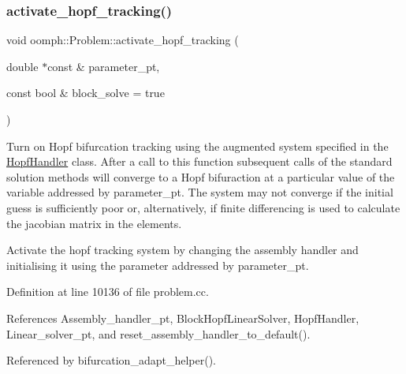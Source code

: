 \subsubsection{\texorpdfstring{activate\+\_\+hopf\+\_\+tracking()}{activate\_hopf\_tracking()}\hspace{0.1cm}{\footnotesize\ttfamily [1/2]}}
{\footnotesize\ttfamily void oomph\+::\+Problem\+::activate\+\_\+hopf\+\_\+tracking (\begin{DoxyParamCaption}\item[{double $\ast$const \&}]{parameter\+\_\+pt,  }\item[{const bool \&}]{block\+\_\+solve = {\ttfamily true} }\end{DoxyParamCaption})}



Turn on Hopf bifurcation tracking using the augmented system specified in the \hyperlink{classoomph_1_1HopfHandler}{Hopf\+Handler} class. After a call to this function subsequent calls of the standard solution methods will converge to a Hopf bifuraction at a particular value of the variable addressed by parameter\+\_\+pt. The system may not converge if the initial guess is sufficiently poor or, alternatively, if finite differencing is used to calculate the jacobian matrix in the elements. 

Activate the hopf tracking system by changing the assembly handler and initialising it using the parameter addressed by parameter\+\_\+pt. 

Definition at line 10136 of file problem.\+cc.



References Assembly\+\_\+handler\+\_\+pt, Block\+Hopf\+Linear\+Solver, Hopf\+Handler, Linear\+\_\+solver\+\_\+pt, and reset\+\_\+assembly\+\_\+handler\+\_\+to\+\_\+default().



Referenced by bifurcation\+\_\+adapt\+\_\+helper().

\mbox{\label{classoomph_1_1Problem_aa0e2d0e105da6b676262d75481bcc8e3}} 
